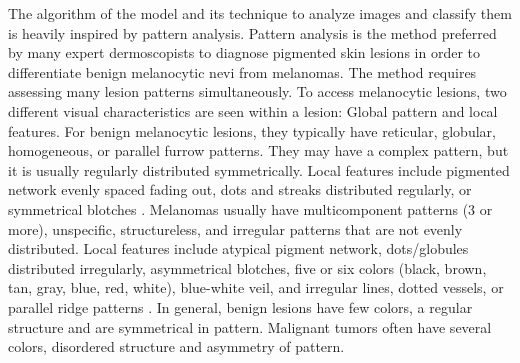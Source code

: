 \documentclass[10pt,twocolumn]{article}
\begin{document}
The algorithm of the model and its technique to analyze images and classify them is heavily inspired by pattern analysis. 
\newline
Pattern analysis is the method preferred by many expert dermoscopists to diagnose pigmented skin lesions in order to differentiate benign melanocytic nevi from melanomas. The method requires assessing many lesion patterns simultaneously. To access melanocytic lesions, two different visual characteristics are seen within a lesion: Global pattern and local features. For benign melanocytic lesions, they typically have reticular, globular, homogeneous, or parallel furrow patterns. They may have a complex pattern, but it is usually regularly distributed symmetrically. Local features include pigmented network evenly spaced fading out, dots and streaks distributed regularly, or symmetrical blotches \cite{DermNet}.
\newline
Melanomas usually have multicomponent patterns (3 or more), unspecific, structureless, and irregular patterns that are not evenly distributed. Local features include atypical pigment network, dots/globules distributed irregularly, asymmetrical blotches, five or six colors (black, brown, tan, gray, blue, red, white), blue-white veil, and irregular lines, dotted vessels, or parallel ridge patterns \cite{DermNet}. 
\newline
In general, benign lesions have few colors, a regular structure and are symmetrical in pattern. Malignant tumors often have several colors, disordered structure and asymmetry of pattern.
\end{document}
